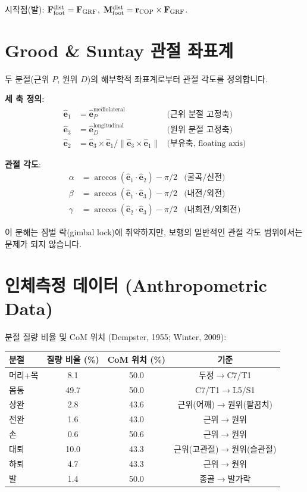 \documentclass[11pt, a4paper]{report}
\begin{document}
시작점(발): $\mathbf{F}_{\text{foot}}^{\text{dist}} = \mathbf{F}_{\text{GRF}}$, $\mathbf{M}_{\text{foot}}^{\text{dist}} = \mathbf{r}_{\text{COP}} \times \mathbf{F}_{\text{GRF}}$.


\section{Grood \& Suntay 관절 좌표계}
\label{sec:grood_suntay}

두 분절(근위 $P$, 원위 $D$)의 해부학적 좌표계로부터 관절 각도를 정의합니다.

\textbf{세 축 정의}:
\begin{align}
\hat{\mathbf{e}}_1 &= \hat{\mathbf{e}}_P^{\text{mediolateral}} & \text{(근위 분절 고정축)} \\
\hat{\mathbf{e}}_3 &= \hat{\mathbf{e}}_D^{\text{longitudinal}} & \text{(원위 분절 고정축)} \\
\hat{\mathbf{e}}_2 &= \hat{\mathbf{e}}_3 \times \hat{\mathbf{e}}_1 / \| \hat{\mathbf{e}}_3 \times \hat{\mathbf{e}}_1 \| & \text{(부유축, floating axis)}
\end{align}

\textbf{관절 각도}:
\begin{align}
\alpha &= \arccos(\hat{\mathbf{e}}_1 \cdot \hat{\mathbf{e}}_2) - \pi/2 & \text{(굴곡/신전)} \\
\beta &= \arccos(\hat{\mathbf{e}}_1 \cdot \hat{\mathbf{e}}_3) - \pi/2 & \text{(내전/외전)} \\
\gamma &= \arccos(\hat{\mathbf{e}}_2 \cdot \hat{\mathbf{e}}_3) - \pi/2 & \text{(내회전/외회전)}
\end{align}

이 분해는 짐벌 락(gimbal lock)에 취약하지만, 보행의 일반적인 관절 각도 범위에서는 문제가 되지 않습니다.


\section{인체측정 데이터 (Anthropometric Data)}
\label{sec:anthropometric}

분절 질량 비율 및 CoM 위치 (Dempster, 1955; Winter, 2009):

\begin{center}
\renewcommand{\arraystretch}{1.3}
\begin{tabular}{lccc}
\toprule
\textbf{분절} & \textbf{질량 비율 (\%)} & \textbf{CoM 위치 (\%)} & \textbf{기준} \\
\midrule
머리+목 & 8.1 & 50.0 & 두정$\rightarrow$C7/T1 \\
몸통 & 49.7 & 50.0 & C7/T1$\rightarrow$L5/S1 \\
상완 & 2.8 & 43.6 & 근위(어깨)$\rightarrow$원위(팔꿈치) \\
전완 & 1.6 & 43.0 & 근위$\rightarrow$원위 \\
손 & 0.6 & 50.6 & 근위$\rightarrow$원위 \\
대퇴 & 10.0 & 43.3 & 근위(고관절)$\rightarrow$원위(슬관절) \\
하퇴 & 4.7 & 43.3 & 근위$\rightarrow$원위 \\
발 & 1.4 & 50.0 & 종골$\rightarrow$발가락 \\
\bottomrule
\end{tabular}
\end{center}
\end{document}
